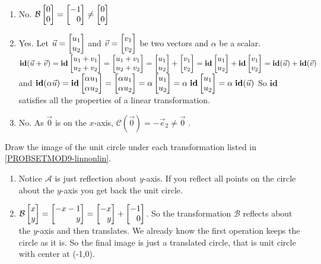 \begin{exercises}
\begin{problist}
\begin{solution}
\begin{enumerate}
				\item No. $\mathcal{B}\mat{0\\0}= \mat{-1\\0}\neq \mat{0\\0}$

				\item Yes. Let $\vec{u}= \mat{u_1\\u_2}$ and $\vec{v}= \mat
					{v_1 \\ v_2}$ be two vectors and $\alpha$ be a scalar.
					$\mathbf{id}(\vec{u}+\vec{v}) = \mathbf{id}\mat
					{u_1 + v_1 \\ u_2 + v_2}= \mat{u_1 + v_1 \\ u_2 + v_2 }=
					\mat{u_1 \\ u_2 }+ \mat{ v_1 \\ v_2 }= \mathbf{id}\mat
					{u_1\\u_2}+ \mathbf{id}\mat{v_1 \\ v_2}= \mathbf{id}(\vec{u}
					) +\mathbf{id}(\vec{v})$
					and
					$\mathbf{id}(\alpha \vec{u}) =\mathbf{id}\mat
					{\alpha u_1 \\ \alpha u_2}= \mat{ \alpha u_1 \\ \alpha u_2}=
					\alpha \mat{ u_1 \\u_2}= \alpha \; \mathbf{id}\mat
					{ u_1 \\u_2}= \alpha \; \mathbf{id}(\vec{u}) $
					So $\mathbf{id}$ satisfies all the properties of a linear
					transformation.

				\item No. As $\vec{0}$ is on the $x$-axis,
					$\mathcal{C}(\vec{0}) = - \vec{e}_{2}\neq \vec{0}$ .
			\end{enumerate}
		\end{solution}

		\prob Draw the image of the unit circle under each transformation listed
		in \ref{PROBSETMOD9-linnonlin}.
		\begin{solution}
			\begin{enumerate}
				\item Notice $\mathcal{A}$ is just reflection about $y$-axis. If
					you reflect all points on the circle about the $y$-axis you get
					back the unit circle.

				\item
					$\mathcal{B}\mat{x\\y}= \mat{-x-1\\y}= \mat{-x\\y}+ \mat
					{-1\\0}$. So the transformation $\mathcal{B}$ reflects about
					the $y$-axis and then translates. We already know the first
					operation keeps the circle as it is. So the final image is just
					a translated circle, that is unit circle with center at (-1,0).


\end{enumerate}
\end{solution}
\end{problist}
\end{exercises}
